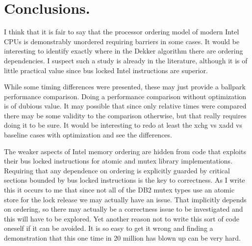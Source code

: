 \section{Conclusions.}

I think that it is fair to say that the processor ordering model of modern Intel CPUs is demonstrably unordered requiring barriers in some cases.  It would be interesting to identify exactly where in the Dekker algorithm there are ordering dependencies.  I suspect such a study is already in the literature, although it is of little practical value since bus locked Intel instructions are superior.

While some timing differences were presented, these may just provide a ballpark performance comparison.  Doing a performance comparison without optimization is of dubious value.  It may possible that since only relative times were compared there may be some validity to the comparison otherwise, but that really requires doing it to be sure.  It would be interesting to redo at least the xchg vs xadd vs baseline cases with optimization and see the differences.

The weaker aspects of Intel memory ordering are hidden from code that exploits their bus locked instructions for atomic and mutex library implementations.  Requiring that any dependence on ordering is explicitly guarded by critical sections bounded by bus locked instructions is the key to correctness.  As I write this it occurs to me that since not all of the DB2 mutex types use an atomic store for the lock release we may actually have an issue.  That implicitly depends on ordering, so there may actually be a correctness issue to be investigated and this will have to be explored.  Yet another reason not to write this sort of code oneself if it can be avoided.  It is so easy to get it wrong and finding a demonstration that this one time in 20 million has blown up can be very hard.

\EndArticle
